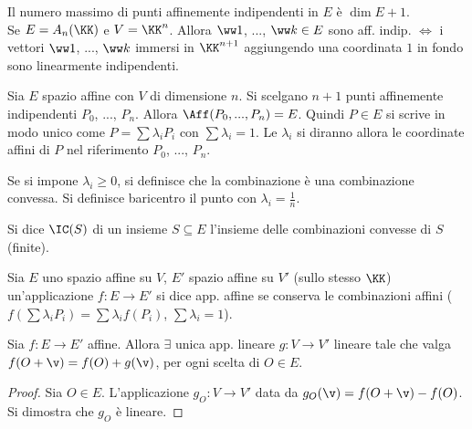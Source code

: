 \documentclass[11pt]{article}
\begin{document}
	\begin{remark}\nl
		\li Il numero massimo di punti affinemente indipendenti in $E$ è $\dim E + 1$. \\
		
		\li Se $E = A_n(\KK)$ e $V = \KK^n$. Allora $\ww 1$, ...,
		$\ww k \in E$ sono aff. indip. $\iff$ i vettori $\ww1$, ...,
		$\ww k$ immersi in $\KK^{n+1}$ aggiungendo una coordinata $1$
		in fondo sono linearmente indipendenti.
	\end{remark}

	\begin{remark} Sia $E$ spazio affine con $V$ di dimensione $n$. Si
		scelgano $n+1$ punti affinemente indipendenti $P_0$, ..., $P_n$.
		Allora $\Aff(P_0, ..., P_n) = E$. Quindi $P \in E$ si scrive
		in modo unico come $P = \sum \lambda_i P_i$ con $\sum \lambda_i = 1$.
		Le $\lambda_i$ si diranno allora le coordinate affini di $P$
		nel riferimento $P_0$, ..., $P_n$.
	\end{remark}

	Se si impone $\lambda_i \geq 0$, si definisce che la
	combinazione è una combinazione convessa. Si definisce
	baricentro il punto con $\lambda_i = \frac{1}{n}$.
	
	\begin{definition}  Si dice $\IC(S)$ di un insieme
		$S \subseteq E$ l'insieme delle combinazioni convesse di $S$ (finite).
	\end{definition}

	
	\begin{definition} Sia $E$ uno spazio affine su $V$, $E'$ spazio
		affine su $V'$ (sullo stesso $\KK$) un'applicazione $f : E \to E'$
		si dice app. affine se conserva le combinazioni affini
		($f(\sum \lambda_i P_i) = \sum \lambda_i f(P_i)$, $\sum \lambda_i = 1$).
	\end{definition}

	\begin{theorem} Sia $f : E \to E'$ affine. Allora $\exists$ unica
		app. lineare $g : V \to V'$ lineare tale che valga
		$f(O + \v) = f(O) + g(\v)$, per ogni scelta di $O \in E$.
	\end{theorem}

	\begin{proof}
		Sia $O \in E$. L'applicazione $g_O : V \to V'$ data da
		$g_O(\v) = f(O + \v) - f(O)$. Si dimostra che $g_O$ è
		lineare.
	\end{proof}
\end{document}
